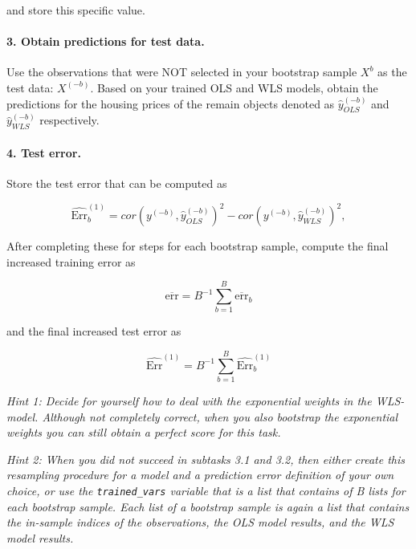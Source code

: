 \documentclass[]{article}
\let\oldparagraph\paragraph
\renewcommand{\paragraph}[1]{\oldparagraph{#1}\mbox{}}
\begin{document}
and store this specific value.

\paragraph{\texorpdfstring{3. \textbf{Obtain predictions for test
data.}}{3. Obtain predictions for test data.}}\label{obtain-predictions-for-test-data.}

Use the observations that were NOT selected in your bootstrap sample
\(X^{b}\) as the test data: \(X^{(-b)}\). Based on your trained OLS and
WLS models, obtain the predictions for the housing prices of the remain
objects denoted as \(\widehat{y}^{(-b)}_{OLS}\) and
\(\widehat{y}^{(-b)}_{WLS}\) respectively.

\paragraph{\texorpdfstring{4. \textbf{Test
error.}}{4. Test error.}}\label{test-error.}

Store the test error that can be computed as

\begin{equation}
\widehat{\text{Err}}^{(1)}_{b} = cor({y}^{(-b)} , \widehat{y}^{(-b)}_{OLS})^2 - cor({y}^{(-b)}, \widehat{y}^{(-b)}_{WLS})^2,
\end{equation}

After completing these for steps for each bootstrap sample, compute the
final increased training error as

\begin{equation}
\overline{\text{err}} = B^{-1} \sum^B_{b = 1} \overline{\text{err}}_b
\end{equation}

and the final increased test error as

\begin{equation}
\widehat{\text{Err}}^{(1)} = B^{-1} \sum^B_{b = 1} \widehat{\text{Err}}^{(1)}_{b}
\end{equation}

\emph{Hint 1: Decide for yourself how to deal with the exponential
weights in the WLS-model. Although not completely correct, when you also
bootstrap the exponential weights you can still obtain a perfect score
for this task.}

\emph{Hint 2: When you did not succeed in subtasks 3.1 and 3.2, then
either create this resampling procedure for a model and a prediction
error definition of your own choice, or use the \texttt{trained\_vars}
variable that is a list that contains of B lists for each bootstrap
sample. Each list of a bootstrap sample is again a list that contains
the in-sample indices of the observations, the OLS model results, and
the WLS model results.}
\end{document}
